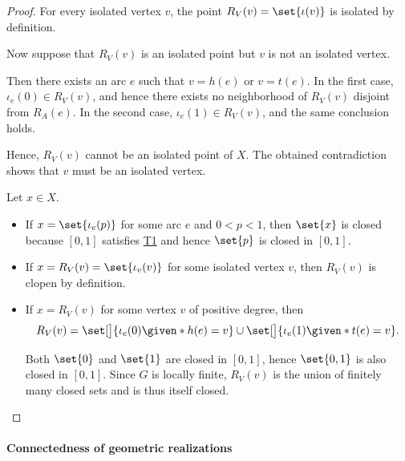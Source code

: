 \begin{proof}

  \SufficiencySubProof* For every isolated vertex \( v \), the point \( R_V(v) = \set{ \iota(v) } \) is isolated by definition.

  \NecessitySubProof* Now suppose that \( R_V(v) \) is an isolated point but \( v \) is not an isolated vertex.

  Then there exists an arc \( e \) such that \( v = h(e) \) or \( v = t(e) \). In the first case, \( \iota_e(0) \in R_V(v) \), and hence there exists no neighborhood of \( R_V(v) \) disjoint from \( R_A(e) \). In the second case, \( \iota_e(1) \in R_V(v) \), and the same conclusion holds.

  Hence, \( R_V(v) \) cannot be an isolated point of \( X \). The obtained contradiction shows that \( v \) must be an isolated vertex.

   Let \( x \in X \).

  \begin{itemize}
    \item If \( x = \set{ \iota_e(p) } \) for some arc \( e \) and \( 0 < p < 1 \), then \( \set{ x } \) is closed because \( [0, 1] \) satisfies \hyperref[def:separation_axioms/T1]{T1} and hence \( \set{ p } \) is closed in \( [0, 1] \).

    \item If \( x = R_V(v) = \set{ \iota_v(v) } \) for some isolated vertex \( v \), then \( R_V(v) \) is clopen by definition.

    \item If \( x = R_V(v) \) for some vertex \( v \) of positive degree, then
    \begin{equation*}
      R_V(v) = \set[\big]{ \iota_e(0) \given* h(e) = v } \cup \set[\big]{ \iota_e(1) \given* t(e) = v }.
    \end{equation*}

    Both \( \set{ 0 } \) and \( \set{ 1 } \) are closed in \( [0, 1] \), hence \( \set{ 0, 1 } \) is also closed in \( [0, 1] \). Since \( G \) is locally finite, \( R_V(v) \) is the union of finitely many closed sets and is thus itself closed.
  \end{itemize}
\end{proof}

\paragraph{Connectedness of geometric realizations}

